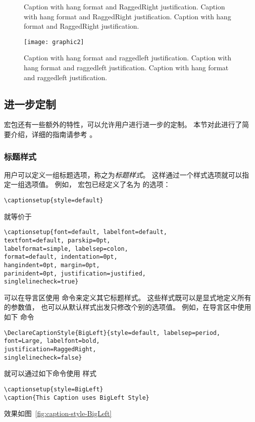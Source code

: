 \begin{figure}[tp]
\begin{minipage}{0.45\linewidth}
		\caption{Caption with hang format and RaggedRight justification.
			Caption with hang format and RaggedRight justification.
			Caption with hang format and RaggedRight justification.}
		\label{fig:caption-format-ex3-RaggedRight}
	\end{minipage}\hfill
	\begin{minipage}{0.45\linewidth}
		\texttt{[image: graphic2]}
		\captionsetup{format=hang,indention=0pt,justification=raggedleft}
		\caption{Caption with hang format and raggedleft justification.
			Caption with hang format and raggedleft justification.
			Caption with hang format and raggedleft justification.}
		\label{fig:caption-format-ex3-raggedleft}
	\end{minipage}
\end{figure}


\subsection{进一步定制}

 宏包还有一些额外的特性，可以允许用户进行进一步的定制。
本节对此进行了简要介绍，详细的指南请参考 \cite{caption-doc}。

\subsubsection{标题样式}

用户可以定义一组标题选项，称之为\emph{标题样式}。
这样通过一个样式选项就可以指定一组选项值。
例如， 宏包已经定义了名为  的选项：
\begin{lstlisting}
\captionsetup{style=default}
\end{lstlisting}
就等价于
\begin{lstlisting}
\captionsetup{font=default, labelfont=default,
textfont=default, parskip=0pt,
labelformat=simple, labelsep=colon,
format=default, indentation=0pt,
hangindent=0pt, margin=0pt,
parinident=0pt, justification=justified,
singlelinecheck=true}
\end{lstlisting}
可以在导言区使用  命令来定义其它标题样式。
这些样式既可以是显式地定义所有的参数值，
也可以从默认样式出发只修改个别的选项值。
例如，在导言区中使用如下  命令
\begin{lstlisting}
\DeclareCaptionStyle{BigLeft}{style=default, labelsep=period,
font=Large, labelfont=bold,
justification=RaggedRight,
singlelinecheck=false}
\end{lstlisting}
就可以通过如下命令使用  样式
\begin{lstlisting}
\captionsetup{style=BigLeft}
\caption{This Caption uses BigLeft Style}
\end{lstlisting}
效果如图~\ref{fig:caption-style-BigLeft}

